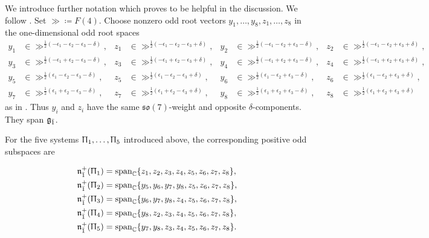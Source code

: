 We introduce further notation which proves to be helpful in the discussion. We follow \cite[Section 10]{jakobsen1994full}. Set $\gg\coloneqq F(4)$. Choose nonzero odd root vectors $y_1,\ldots,y_8,z_1,\ldots,z_8$ in the one-dimensional odd root spaces 
\begin{equation}
\begin{aligned}
y_1&\in\gg^{\frac12(-\epsilon_1-\epsilon_2-\epsilon_3-\delta)},&
z_1&\in\gg^{\frac12(-\epsilon_1-\epsilon_2-\epsilon_3+\delta)},&
y_2&\in\gg^{\frac12(-\epsilon_1-\epsilon_2+\epsilon_3-\delta)},&
z_2&\in\gg^{\frac12(-\epsilon_1-\epsilon_2+\epsilon_3+\delta)},\\
y_3&\in\gg^{\frac12(-\epsilon_1+\epsilon_2-\epsilon_3-\delta)},&
z_3&\in\gg^{\frac12(-\epsilon_1+\epsilon_2-\epsilon_3+\delta)},&
y_4&\in\gg^{\frac12(-\epsilon_1+\epsilon_2+\epsilon_3-\delta)},&
z_4&\in\gg^{\frac12(-\epsilon_1+\epsilon_2+\epsilon_3+\delta)},\\
y_5&\in\gg^{\frac12(\epsilon_1-\epsilon_2-\epsilon_3-\delta)},&
z_5&\in\gg^{\frac12(\epsilon_1-\epsilon_2-\epsilon_3+\delta)},&
y_6&\in\gg^{\frac12(\epsilon_1-\epsilon_2+\epsilon_3-\delta)},&
z_6&\in\gg^{\frac12(\epsilon_1-\epsilon_2+\epsilon_3+\delta)},\\
y_7&\in\gg^{\frac12(\epsilon_1+\epsilon_2-\epsilon_3-\delta)},&
z_7&\in\gg^{\frac12(\epsilon_1+\epsilon_2-\epsilon_3+\delta)},&
y_8&\in\gg^{\frac12(\epsilon_1+\epsilon_2+\epsilon_3-\delta)},&
z_8&\in\gg^{\frac12(\epsilon_1+\epsilon_2+\epsilon_3+\delta)}
\end{aligned}
\end{equation}
as in \cite{jakobsen1994full}. Thus $y_i$ and $z_i$ have the same $\mathfrak{so}(7)$-weight and
opposite $\delta$-components. They span ${\mathfrak{g}_{\bar{1}}}$. 

For the five systems $\Uppi_1,\ldots,\Uppi_5$ introduced above,
the corresponding positive odd subspaces are

\begin{equation}\label{eq::odd_root_space_different_systems_F(4)}
\begin{aligned}
{\mathfrak{n}}_{\bar1}^{+}(\Uppi_1)
&=
\operatorname{span}_{{\mathbb C}}
\{z_1,z_2,z_3,z_4,z_5,z_6,z_7,z_8\},
\\
{\mathfrak{n}}_{\bar1}^{+}(\Uppi_2)
&=
\operatorname{span}_{{\mathbb C}}
\{y_5,y_6,y_7,y_8,z_5,z_6,z_7,z_8\},
\\
{\mathfrak{n}}_{\bar1}^{+}(\Uppi_3)
&=
\operatorname{span}_{{\mathbb C}}
\{y_6,y_7,y_8,z_4,z_5,z_6,z_7,z_8\},
\\
{\mathfrak{n}}_{\bar1}^{+}(\Uppi_4)
&=
\operatorname{span}_{{\mathbb C}}
\{y_8,z_2,z_3,z_4,z_5,z_6,z_7,z_8\},
\\
{\mathfrak{n}}_{\bar1}^{+}(\Uppi_5)
&=
\operatorname{span}_{{\mathbb C}}
\{y_7,y_8,z_3,z_4,z_5,z_6,z_7,z_8\}.
\end{aligned}
\end{equation}

